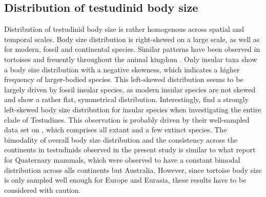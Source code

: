 






\subsection{Distribution of testudinid body size}

Distribution of testudinid body size is rather homogenous across spatial and temporal scales.
Body size distribution is right-skewed on a large scale, as well as for modern, fossil and continental species. Similar patterns have been observed in tortoises \citep{Angielczyk2015,Jaffe2011a} and freuently throughout the animal kingdom \citep{Blackburn1994,Kozlowski2002}.
Only insular taxa show a body size distribution with a negative skewness, which indicates a higher frequency of larger-bodied species. This left-skewed distribution seems to be largely driven by fossil insular species, as modern insular species are not skewed and show a rather flat, symmetrical distribution. Interestingly, \cite{Angielczyk2015} find a strongly left-skewed body size distribution for insular species when investigating the entire clade of Testudines. This observation is probably driven by their well-sampled data set on \T, which comprises all extant and a few extinct species. 
The bimodality of overall body size distribution and the consistency across the continents in testudinids observed in the present study is similar to what \cite{Lyons2008,Smith2004} report for Quaternary mammals, which were observed to have a constant bimodal distribution across alls continents but Australia.
However, since tortoise body size is only sampled well enough for Europe and Eurasia, these results have to be considered with caution.

